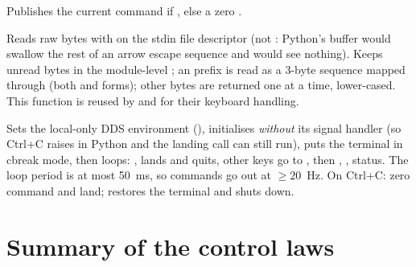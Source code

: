 Publishes the current command if , else a zero .

Reads raw bytes with  on the stdin file descriptor (not : Python's buffer
would swallow the rest of an arrow escape sequence and  would see nothing). Keeps unread bytes in
the module-level ; an  prefix is read as a 3-byte sequence mapped through 
(both \code{ESC [ A} and  forms); other bytes are returned one at a time, lower-cased. This function
is reused by  and  for their keyboard handling.

Sets the local-only DDS environment (), initialises  \emph{without} its signal
handler (so Ctrl+C raises  in Python and the landing call can still run), puts the
terminal in cbreak mode, then loops: ,  lands and quits, other keys go to
, then , , status. The loop period is at most 50~ms, so commands go out
at $\ge 20$~Hz. On Ctrl+C: zero command and land;  restores the terminal and shuts down.

\section{Summary of the control laws}

